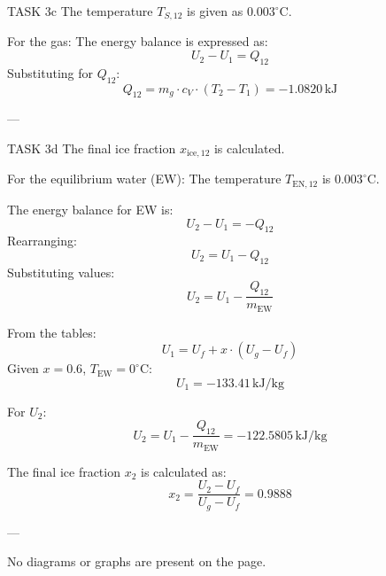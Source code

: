 TASK 3c  
The temperature \( T_{S,12} \) is given as \( 0.003^\circ\text{C} \).  

For the gas:  
The energy balance is expressed as:  
\[
U_2 - U_1 = Q_{12}
\]  
Substituting for \( Q_{12} \):  
\[
Q_{12} = m_g \cdot c_V \cdot (T_2 - T_1) = -1.0820 \, \text{kJ}
\]  

---

TASK 3d  
The final ice fraction \( x_{\text{ice},12} \) is calculated.  

For the equilibrium water (EW):  
The temperature \( T_{\text{EN},12} \) is \( 0.003^\circ\text{C} \).  

The energy balance for EW is:  
\[
U_2 - U_1 = -Q_{12}
\]  
Rearranging:  
\[
U_2 = U_1 - Q_{12}
\]  
Substituting values:  
\[
U_2 = U_1 - \frac{Q_{12}}{m_{\text{EW}}}
\]  

From the tables:  
\[
U_1 = U_f + x \cdot (U_g - U_f)
\]  
Given \( x = 0.6 \), \( T_{\text{EW}} = 0^\circ\text{C} \):  
\[
U_1 = -133.41 \, \text{kJ/kg}
\]  

For \( U_2 \):  
\[
U_2 = U_1 - \frac{Q_{12}}{m_{\text{EW}}} = -122.5805 \, \text{kJ/kg}
\]  

The final ice fraction \( x_2 \) is calculated as:  
\[
x_2 = \frac{U_2 - U_f}{U_g - U_f} = 0.9888
\]  

---

No diagrams or graphs are present on the page.